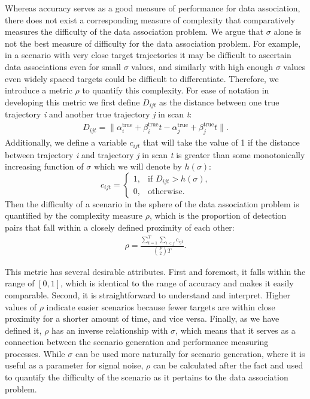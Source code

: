 Whereas accuracy serves as a good measure of performance for data association, there does not exist a corresponding measure of complexity that comparatively measures the difficulty of the data association problem. We argue that $\sigma$ alone is not the best measure of difficulty for the data association problem. For example, in a scenario with very close target trajectories it may be difficult to ascertain data associations even for small $\sigma$ values, and similarly with high enough $\sigma$ values even widely spaced targets could be difficult to differentiate. Therefore, we introduce a metric $\rho$ to quantify this complexity. For ease of notation in developing this metric we first define $D_{ijt}$ as the distance between one true trajectory \textit{i} and another true trajectory \textit{j} in scan \textit{t}:
\begin{align*}
D_{ijt} = \| \alpha^{\text{true}}_{i} + \beta^{\text{true}}_{i}t - \alpha^{\text{true}}_{j} + \beta^{\text{true}}_{j}t \|.
\end{align*}
Additionally, we define a variable $c_{ijt}$ that will take the value of 1 if the distance between trajectory \textit{i} and trajectory \textit{j} in scan \textit{t} is greater than some monotonically increasing function of $\sigma$ which we will denote by $h(\sigma)$: 
\[c_{ijt} = 
\begin{cases}
1, & \text{if $D_{ijt} > h(\sigma)$,}\\
0, & \text{otherwise.}
\end{cases}\]
Then the difficulty of a scenario in the sphere of the data association problem is quantified by the complexity measure $\rho$, which is the proportion of detection pairs that fall within a closely defined proximity of each other:
\begin{align*}
\rho =  \frac{\sum\limits_{t=1}^{T}\sum\limits_{i<j}c_{ijt}}{\binom{P}{2} T}.
\end{align*}

This metric has several desirable attributes. First and foremost, it falls within the range of $[0,1]$, which is identical to the range of accuracy and makes it easily comparable. Second, it is straightforward to understand and interpret. Higher values of $\rho$ indicate easier scenarios because fewer targets are within close proximity for a shorter amount of time, and vice versa. Finally, as we have defined it, $\rho$ has an inverse relationship with $\sigma$, which means that it serves as a connection between the scenario generation and performance measuring processes. While $\sigma$ can be used more naturally for scenario generation, where it is useful as a parameter for signal noise, $\rho$ can be calculated after the fact and used to quantify the difficulty of the scenario as it pertains to the data association problem. 

